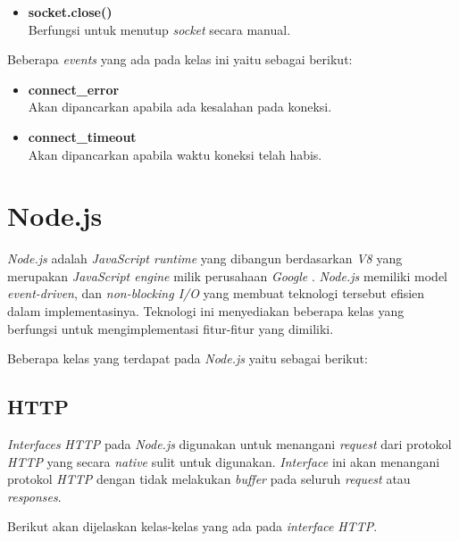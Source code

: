 \begin{enumerate}
\begin{itemize}
	\item \textbf{socket.close()} \\ Berfungsi untuk menutup \textit{socket} secara manual.
	\end{itemize}

	Beberapa \textit{events} yang ada pada kelas ini yaitu sebagai berikut:
	\begin{itemize}
		\item \textbf{connect\_error} \\ Akan dipancarkan apabila ada kesalahan pada koneksi.
		\item \textbf{connect\_timeout} \\ Akan dipancarkan apabila waktu koneksi telah habis.
	\end{itemize}
\end{enumerate} 


\section{Node.js}
\label{sec:Node.js}

\textit{Node.js} adalah \textit{JavaScript runtime} yang dibangun berdasarkan \textit{V8} yang merupakan \textit{JavaScript engine} milik perusahaan \textit{Google} \cite{nodejs}. \textit{Node.js} memiliki model \textit{event-driven}, dan \textit{non-blocking I/O} yang membuat teknologi tersebut efisien dalam implementasinya. Teknologi ini menyediakan beberapa kelas yang berfungsi untuk mengimplementasi fitur-fitur yang dimiliki.

Beberapa kelas yang terdapat pada \textit{Node.js} yaitu sebagai berikut: 

\subsection{HTTP}
\textit{Interfaces} \textit{HTTP} pada \textit{Node.js} digunakan untuk menangani \textit{request} dari protokol \textit{HTTP} yang secara \textit{native} sulit untuk digunakan. \textit{Interface} ini akan menangani protokol \textit{HTTP} dengan tidak melakukan \textit{buffer} pada seluruh \textit{request} atau \textit{responses}.

Berikut akan dijelaskan kelas-kelas yang ada pada \textit{interface} \textit{HTTP}.


